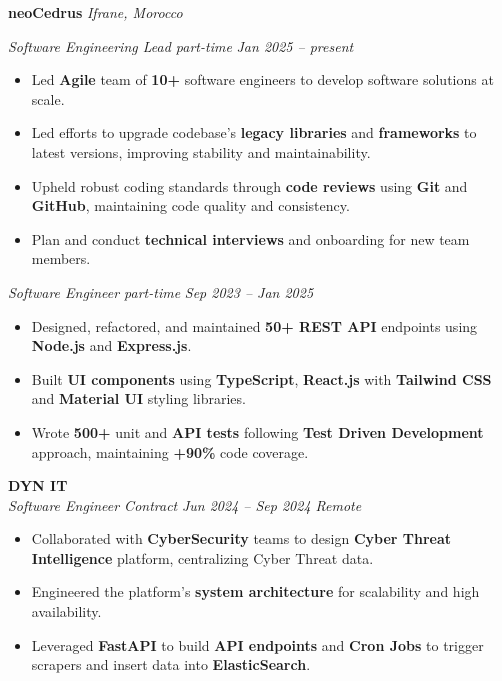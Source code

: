 \documentclass[a4paper, 10pt]{article}
\begin{document}
\textbf{neoCedrus} \hfill \textit{ Ifrane, Morocco}

\noindent\begin{minipage}[t]{0.02\textwidth}
\vspace{-5pt}
\hspace{0pt}{\color[RGB]{229, 229, 229}\rule{1.8pt}{123pt}}
\end{minipage}%
\hspace{0pt}%
\begin{minipage}[t]{0.95\textwidth}
\vspace{-8pt}
\textit{Software Engineering Lead \textbar{} part-time} \hfill \textit{Jan 2025 -- present}
\begin{itemize}[leftmargin=10pt, itemsep=-1pt, topsep=2pt]
\item Led \textbf{Agile} team of \textbf{10+} software engineers to develop software solutions at scale.
\item Led efforts to upgrade codebase's \textbf{legacy libraries} and \textbf{frameworks} to latest versions, improving stability and maintainability.
\item Upheld robust coding standards through \textbf{code reviews} using \textbf{Git} and \textbf{GitHub}, maintaining code quality and consistency.
\item Plan and conduct \textbf{technical interviews} and onboarding for new team members.
\end{itemize}

\vspace{3pt}
\textit{Software Engineer \textbar{} part-time} \hfill \textit{Sep 2023 -- Jan 2025}
\begin{itemize}[leftmargin=10pt, itemsep=-1pt, topsep=2pt]
\item Designed, refactored, and maintained \textbf{50+ REST API} endpoints using \textbf{Node.js} and \textbf{Express.js}.
\item Built \textbf{UI components} using \textbf{TypeScript}, \textbf{React.js} with \textbf{Tailwind CSS} and \textbf{Material UI} styling libraries.
\item Wrote \textbf{500+} unit and \textbf{API tests} following \textbf{Test Driven Development} approach, maintaining \textbf{+90\%} code coverage.
\end{itemize}
\end{minipage}

\textbf{DYN IT} \\
\textit{Software Engineer \textbar{} Contract} \hfill \textit{Jun 2024 -- Sep 2024 \textbar{} Remote}
\begin{itemize}[leftmargin=10pt, itemsep=-1pt, topsep=2pt]
\item Collaborated with \textbf{CyberSecurity} teams to design \textbf{Cyber Threat Intelligence} platform, centralizing Cyber Threat data.
\item Engineered the platform's \textbf{system architecture} for scalability and high availability.
\item Leveraged \textbf{FastAPI} to build \textbf{API endpoints} and \textbf{Cron Jobs} to trigger scrapers and insert data into \textbf{ElasticSearch}.
\end{itemize}
\end{document}

